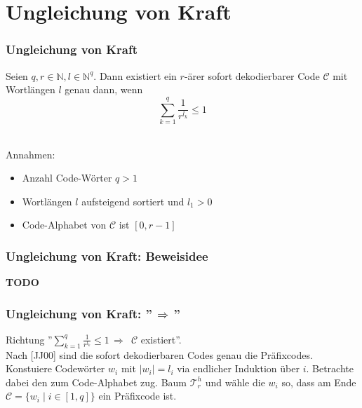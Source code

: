 \documentclass{beamer}
\begin{document}
\section{Ungleichung von Kraft}
\begin{frame}
    \frametitle{Ungleichung von Kraft}
    Seien $q,r \in \mathbb{N}, l \in \mathbb{N}^q$. Dann existiert ein $r$-ärer sofort dekodierbarer Code $\mathcal{C}$
    mit Wortlängen $l$ genau dann, wenn
    $$
        \sum_{k=1}^{q} \frac{1}{r^{l_k}} \leq 1
    $$\\[20pt]
    \pause

    Annahmen:

    \begin{itemize}
        \item Anzahl Code-Wörter $q > 1$
        \pause
        \item Wortlängen $l$ aufsteigend sortiert und $l_1 > 0$
        \pause
        \item Code-Alphabet von $\mathcal{C}$ ist $[0,r-1]$
    \end{itemize}
\end{frame}

\begin{frame}
    \frametitle{Ungleichung von Kraft: Beweisidee}
    \textbf{TODO}
\end{frame}

\begin{frame}
    \frametitle{Ungleichung von Kraft: ''$\,\Longrightarrow\,$''}
    Richtung ''$\sum_{k=1}^{q} \frac{1}{r^{l_k}} \leq 1 \,\Longrightarrow\,$ $\mathcal{C}$ existiert''.\\[10pt]
    \pause
    Nach [JJ00] sind die sofort dekodierbaren Codes genau die Präfixcodes.\\[10pt]
    \pause
    Konstuiere Codewörter $w_i$ mit $|w_i| = l_i$ via endlicher Induktion über $i$.
    Betrachte dabei den zum Code-Alphabet zug. Baum $\mathcal{T}_r^h$ und wähle die $w_i$ so, dass
    am Ende $\mathcal{C} = \{w_i \mid i \in [1,q]\}$ ein Präfixcode ist.
\end{frame}
\end{document}
